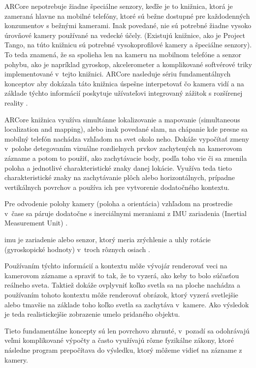 ARCore nepotrebuje žiadne špeciálne senzory, keďže je to knižnica, ktorá je zameraná hlavne na mobilné telefóny, ktoré sú bežne dostupné pre každodenných konzumentov s bežnými kamerami. Inak povedané, nie sú potrebné žiadne vysoko úrovňové kamery používané na vedecké účely. (Existujú knižnice, ako je Project Tango, na túto knižnicu sú potrebné vysokoprofilové kamery a špeciálne senzory). To teda znamená, že sa spolieha len na kameru na mobilnom telefóne a senzor pohybu, ako je napríklad gyroskop, akcelerometer a komplikované softvérové triky implementované v~tejto knižnici. ARCore nasleduje sériu fundamentálnych konceptov aby dokázala táto knižnica úspešne interpetovať čo kamera vidí a na základe týchto informácií poskytuje užívateľovi integrovaný zážitok s rozšírenej reality \cite{conway2023arcore}. 

ARCore knižnica využíva  simultánne lokalizovanie a mapovanie (simultaneous localization and mapping), alebo inak povedané \gls{slam}, na chápanie kde presne sa mobilný telefón nachádza vzhľadom na svet okolo neho. Dokáže vypočítať zmeny v~polohe detegovaním vizuálne rozdielnych prvkov zachytených na kamerovom zázname a potom to použiť, ako zachytávacie body, podľa toho vie či sa zmenila poloha a jednotlivé charakteristické znaky danej lokácie. Využíva teda tieto charakteristické znaky na zachytávanie plôch alebo horizontálnych, prípadne vertikálnych povrchov a používa ich pre vytvorenie dodatočného kontextu. 

Pre odvodenie polohy kamery (poloha a orientácia) vzhľadom na prostredie v~čase sa páruje dodatočne s inerciálnymi meraniami z IMU zariadenia (Inertial Measurement Unit) \cite{conway2023arcore}. 

\gls{imu} je zariadenie alebo senzor, ktorý meria zrýchlenie a uhly rotácie (gyroskopické hodnoty) v~troch rôznych osiach \cite{vectornav2024imu}.

Používaním týchto informácií a kontextu môže vývojár renderovať veci na kamerovom zázname a spraviť to tak, že to vyzerá, ako keby to bolo súčasťou reálneho sveta. Taktiež dokáže ovplyvniť koľko svetla sa na ploche nachádza a používaním tohoto kontextu môže renderovať obrázok, ktorý vyzerá svetlejšie alebo tmavšie na základe toho koľko svetla sa zachytáva v~kamere. Ako výsledok je teda realistickejšie zobrazenie umelo pridaného objektu.

Tieto fundamentálne koncepty sú len povrchovo zhrnuté, v~pozadí sa odohrávajú veľmi komplikované výpočty a často využívajú rôzne fyzikálne zákony, ktoré následne program prepočítava do výsledku, ktorý môžeme vidieť na zázname z kamery.

